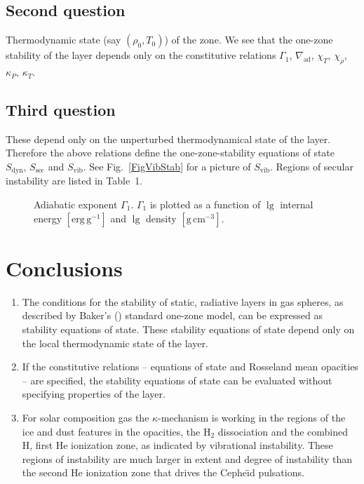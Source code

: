 \documentclass{layout}
\begin{document}
\subsection{Second question}
   Thermodynamic state (say $(\rho_0, T_0)$) of the zone.
   We see that the one-zone stability of the layer depends only on
   the constitutive relations $\Gamma_1$,
   $\nabla_{\mathrm{ad}}$, $\chi_T^{},\,\chi_\rho^{}$,
   $\kappa_P^{},\,\kappa_T^{}$.

\subsection{Third question}
   These depend only on the unperturbed
   thermodynamical state of the layer. Therefore the above relations
   define the one-zone-stability equations of state
   $S_{\mathrm{dyn}},\,S_{\mathrm{sec}}$
   and $S_{\mathrm{vib}}$. See Fig.~\ref{FigVibStab} for a picture of
   $S_{\mathrm{vib}}$. Regions of secular instability are
   listed in Table~1.

%
   \begin{figure*}
   \centering
   \caption{Adiabatic exponent $\Gamma_1$.
               $\Gamma_1$ is plotted as a function of
               $\lg$ internal energy $\mathrm{[erg\,g^{-1}]}$ and $\lg$
               density $\mathrm{[g\,cm^{-3}]}$.}
              \label{FigGam}%
    \end{figure*}
%

\section{Conclusions}

   \begin{enumerate}
      \item The conditions for the stability of static, radiative
         layers in gas spheres, as described by Baker's (\cite{baker})
         standard one-zone model, can be expressed as stability
         equations of state. These stability equations of state depend
         only on the local thermodynamic state of the layer.
      \item If the constitutive relations -- equations of state and
         Rosseland mean opacities -- are specified, the stability
         equations of state can be evaluated without specifying
         properties of the layer.
      \item For solar composition gas the $\kappa$-mechanism is
         working in the regions of the ice and dust features
         in the opacities, the $\mathrm{H}_2$ dissociation and the
         combined H, first He ionization zone, as
         indicated by vibrational instability. These regions
         of instability are much larger in extent and degree of
         instability than the second He ionization zone
         that drives the Cephe{\"\i}d pulsations.
   \end{enumerate}
\end{document}
